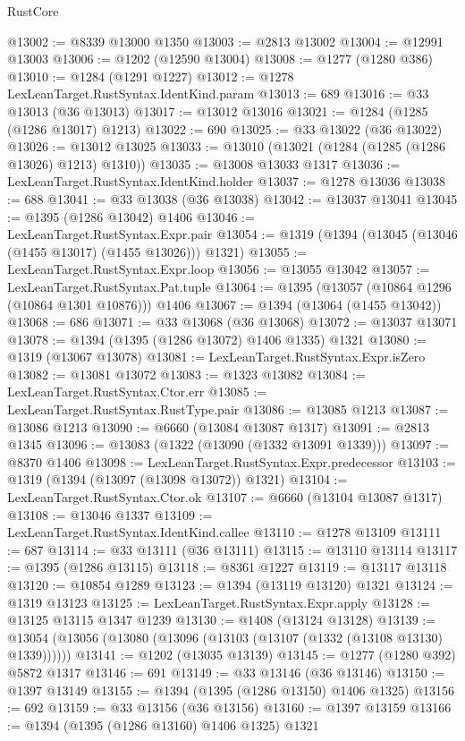 \begin{lexlean}{RustCore}
\begin{coremodule}
@13002 := @8339 @13000 @1350
@13003 := @2813 @13002
@13004 := @12991 @13003
@13006 := @1202 (@12590 @13004)
@13008 := @1277 (@1280 @386)
@13010 := @1284 (@1291 @1227)
@13012 := @1278 LexLeanTarget.RustSyntax.IdentKind.param
@13013 := 689
@13016 := @33 @13013 (@36 @13013)
@13017 := @13012 @13016
@13021 := @1284 (@1285 (@1286 @13017) @1213)
@13022 := 690
@13025 := @33 @13022 (@36 @13022)
@13026 := @13012 @13025
@13033 := @13010 (@13021 (@1284 (@1285 (@1286 @13026) @1213) @1310))
@13035 := @13008 @13033 @1317
@13036 := LexLeanTarget.RustSyntax.IdentKind.holder
@13037 := @1278 @13036
@13038 := 688
@13041 := @33 @13038 (@36 @13038)
@13042 := @13037 @13041
@13045 := @1395 (@1286 @13042) @1406
@13046 := LexLeanTarget.RustSyntax.Expr.pair
@13054 := @1319 (@1394 (@13045 (@13046 (@1455 @13017) (@1455 @13026))) @1321)
@13055 := LexLeanTarget.RustSyntax.Expr.loop
@13056 := @13055 @13042
@13057 := LexLeanTarget.RustSyntax.Pat.tuple
@13064 := @1395 (@13057 (@10864 @1296 (@10864 @1301 @10876))) @1406
@13067 := @1394 (@13064 (@1455 @13042))
@13068 := 686
@13071 := @33 @13068 (@36 @13068)
@13072 := @13037 @13071
@13078 := @1394 (@1395 (@1286 @13072) @1406 @1335) @1321
@13080 := @1319 (@13067 @13078)
@13081 := LexLeanTarget.RustSyntax.Expr.isZero
@13082 := @13081 @13072
@13083 := @1323 @13082
@13084 := LexLeanTarget.RustSyntax.Ctor.err
@13085 := LexLeanTarget.RustSyntax.RustType.pair
@13086 := @13085 @1213
@13087 := @13086 @1213
@13090 := @6660 (@13084 @13087 @1317)
@13091 := @2813 @1345
@13096 := @13083 (@1322 (@13090 (@1332 @13091 @1339)))
@13097 := @8370 @1406
@13098 := LexLeanTarget.RustSyntax.Expr.predecessor
@13103 := @1319 (@1394 (@13097 (@13098 @13072)) @1321)
@13104 := LexLeanTarget.RustSyntax.Ctor.ok
@13107 := @6660 (@13104 @13087 @1317)
@13108 := @13046 @1337
@13109 := LexLeanTarget.RustSyntax.IdentKind.callee
@13110 := @1278 @13109
@13111 := 687
@13114 := @33 @13111 (@36 @13111)
@13115 := @13110 @13114
@13117 := @1395 (@1286 @13115)
@13118 := @8361 @1227
@13119 := @13117 @13118
@13120 := @10854 @1289
@13123 := @1394 (@13119 @13120) @1321
@13124 := @1319 @13123
@13125 := LexLeanTarget.RustSyntax.Expr.apply
@13128 := @13125 @13115 @1347 @1239
@13130 := @1408 (@13124 @13128)
@13139 := @13054 (@13056 (@13080 (@13096 (@13103 (@13107 (@1332 (@13108 @13130) @1339))))))
@13141 := @1202 (@13035 @13139)
@13145 := @1277 (@1280 @392) @5872 @1317
@13146 := 691
@13149 := @33 @13146 (@36 @13146)
@13150 := @1397 @13149
@13155 := @1394 (@1395 (@1286 @13150) @1406 @1325)
@13156 := 692
@13159 := @33 @13156 (@36 @13156)
@13160 := @1397 @13159
@13166 := @1394 (@1395 (@1286 @13160) @1406 @1325) @1321

\end{coremodule}
\end{lexlean}

